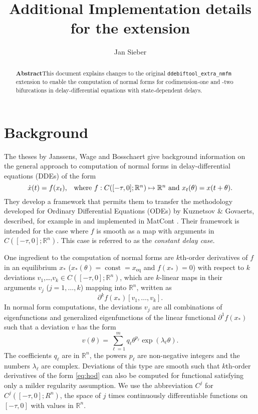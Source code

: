 \documentclass[11pt]{scrartcl}
\title{Additional Implementation details for the
  \blist{ddebiftool_extra_nmfm} extension} \author{Jan Sieber}\date{}
\newcommand{\xeq}{x_\mathrm{eq}}
\newcommand{\R}{\mathbb{R}}
\newcommand{\blist}[1]{\mbox{\lstinline!#1!}}
\begin{document}
\maketitle
\tableofcontents
\begin{abstract}
  \noindent
  \textbf{\textsf{Abstract}}\quad This document explains changes to
  the original \blist{ddebiftool_extra_nmfm} extension to enable the
  computation of normal forms for codimension-one and -two
  bifurcations in delay-differential equations with state-dependent
  delays.
\end{abstract}


\section{Background}
\label{sec:background}
The theses by Janssens, Wage and Bosschaert
\cite{Janssens:Thesis,W14,MMB15} give background information on the
general approach to computation of normal forms in delay-differential
equations (DDEs) of the form
\begin{equation}
  \label{eq:dde}
  \dot x(t)=f(x_t)\mbox{,\quad where $f:C([-\tau,0];\R^n)\mapsto\R^n$ 
    and $x_t(\theta)=x(t+\theta)$.}
\end{equation}
They develop a framework that permits them to transfer the methodology
developed for Ordinary Differential Equations (ODEs) by Kuznetsov \&
Govaerts, described, for example in \cite{Kuznetsov:Elements:2004,G00}
and implemented in MatCont \cite{DGK03}. Their framework is intended
for the case where $f$ is smooth as a map with arguments in
$C([-\tau,0];\R^n)$. This case is referred to as the \emph{constant delay
case}.

One ingredient to the computation of normal forms are $k$th-order
derivatives of $f$ in an equilibrium $x_*$
($x_*(\theta)=\operatorname{const}=\xeq$ and $f(x_*)=0$) with respect to
$k$ deviations $v_1$,\ldots,$v_k\in C([-\tau,0];\R^n)$, which are
$k$-linear maps in their arguments $v_j$ ($j=1,\ldots,k$) mapping into
$\R^n$, written as
\begin{equation}\label{eq:hod}
  \partial^kf(x_*)[v_1,\ldots,v_k]\mbox{.}
\end{equation}
In normal form computations, the deviations $v_j$ are all combinations
of eigenfunctions and generalized eigenfunctions of the linear
functional $\partial^1f(x_*)$ such that a deviation $v$ has the form
\begin{displaymath}
  v(\theta)=\sum_{\ell=1}^{m}q_{\ell}\theta^{p_{\ell}}\exp(\lambda_{\ell}\theta)\mbox{.}
\end{displaymath}
The coefficients $q_\ell$ are in $\R^n$, the powers $p_\ell$ are
non-negative integers and the numbers $\lambda_\ell$ are
complex. Deviations of this type are smooth such that $k$th-order
derivatives of the form \eqref{eq:hod} can also be computed for
functional satisfying only a milder regularity assumption. We use the
abbreviation $C^j$ for $C^j([-\tau,0];R^n)$, the space of $j$ times
continuously differentiable functions on $[-\tau,0]$ with values in
$\R^n$.
\end{document}
